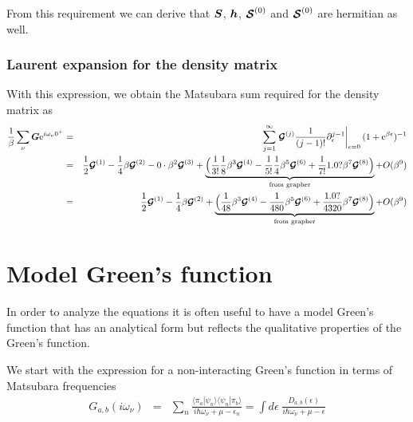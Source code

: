 \documentclass[11pt,a4paper]{report}
\begin{document}
From this requirement we can derive that $\bm{S}$, $\bm{h}$,
$\bm{\mathcal{S}}^{(0)}$ and $\bm{\mathcal{S}}^{(0)}$ are hermitian as well.

\subsubsection{Laurent expansion for the density matrix}
With this expression, we obtain the Matsubara sum required for the
density matrix as
\begin{eqnarray*}
\frac{1}{\beta}\sum_\nu\bm{G}\mathrm{e}^{i\omega_\nu0^+}
&=&\sum_{j=1}^\infty
\left.\bm{\mathcal{G}}^{(j)}\frac{1}{(j-1)!}
\partial^{j-1}_\epsilon\right|_{\epsilon=0}(1+\mathrm{e}^{\beta\epsilon})^{-1}
\nonumber\\
&=&
\frac{1}{2}\bm{\mathcal{G}}^{(1)}
-\frac{1}{4}\beta\bm{\mathcal{G}}^{(2)}
-0\cdot\beta^2\bm{\mathcal{G}}^{(3)}
+\underbrace{\Bigl(
\frac{1}{3!}\frac{1}{8}\beta^3\bm{\mathcal{G}}^{(4)}
-\frac{1}{5!}\frac{1}{4}\beta^5\bm{\mathcal{G}}^{(6)}
+\frac{1}{7!}1.0?\beta^7\bm{\mathcal{G}}^{(8)}\Bigr)
}_{\text{from grapher}}
+O(\beta^9)
\nonumber\\
&=&
\frac{1}{2}\bm{\mathcal{G}}^{(1)}
-\frac{1}{4}\beta\bm{\mathcal{G}}^{(2)}
+\underbrace{\Bigl(
\frac{1}{48}\beta^3\bm{\mathcal{G}}^{(4)}
-\frac{1}{480}\beta^5\bm{\mathcal{G}}^{(6)}
+\frac{1.0?}{4320}\beta^7\bm{\mathcal{G}}^{(8)}\Bigr)}_{\text{from grapher}}
+O(\beta^9)
\end{eqnarray*}


\section{Model Green's function}
In order to analyze the equations it is often useful to have a model
Green's function that has an analytical form but reflects the
qualitative properties of the Green's function.

We start with the expression for a non-interacting Green's
function in terms of Matsubara frequencies
\begin{eqnarray}
G_{a,b}(i\omega_\nu)
&=&
\sum_n\frac{\langle\pi_a|\psi_n\rangle
\langle\psi_n|\pi_b\rangle}{i\hbar\omega_\nu+\mu-\epsilon_n}
=
\int d\epsilon\;\frac{D_{a,b}(\epsilon)}{i\hbar\omega_\nu+\mu-\epsilon}
\end{eqnarray}
\end{document}
